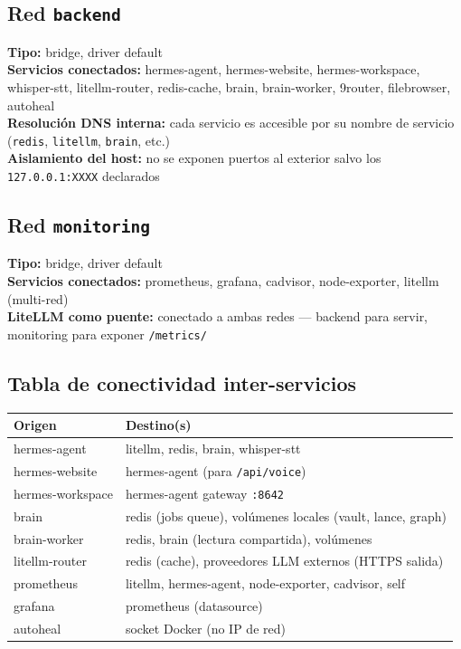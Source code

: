 \documentclass[11pt,a4paper]{article}
\newcommand{\dato}[2]{\textbf{\color{hermesblue}#1:} #2}
\begin{document}
\subsection{Red \texttt{backend}}

\dato{Tipo}{bridge, driver default}\\
\dato{Servicios conectados}{hermes-agent, hermes-website, hermes-workspace, whisper-stt, litellm-router, redis-cache, brain, brain-worker, 9router, filebrowser, autoheal}\\
\dato{Resolución DNS interna}{cada servicio es accesible por su nombre de servicio (\texttt{redis}, \texttt{litellm}, \texttt{brain}, etc.)}\\
\dato{Aislamiento del host}{no se exponen puertos al exterior salvo los \texttt{127.0.0.1:XXXX} declarados}

\subsection{Red \texttt{monitoring}}

\dato{Tipo}{bridge, driver default}\\
\dato{Servicios conectados}{prometheus, grafana, cadvisor, node-exporter, litellm (multi-red)}\\
\dato{LiteLLM como puente}{conectado a ambas redes — backend para servir, monitoring para exponer \texttt{/metrics/}}

\subsection{Tabla de conectividad inter-servicios}

\begin{center}
\begin{tabularx}{0.95\textwidth}{|l|X|}
\hline
\rowcolor{hermesblue}\color{white}\textbf{Origen} & \color{white}\textbf{Destino(s)}\\
\hline
hermes-agent & litellm, redis, brain, whisper-stt\\
hermes-website & hermes-agent (para \texttt{/api/voice})\\
hermes-workspace & hermes-agent gateway \texttt{:8642}\\
brain & redis (jobs queue), volúmenes locales (vault, lance, graph)\\
brain-worker & redis, brain (lectura compartida), volúmenes\\
litellm-router & redis (cache), proveedores LLM externos (HTTPS salida)\\
prometheus & litellm, hermes-agent, node-exporter, cadvisor, self\\
grafana & prometheus (datasource)\\
autoheal & socket Docker (no IP de red)\\
\hline
\end{tabularx}
\end{center}
\end{document}
